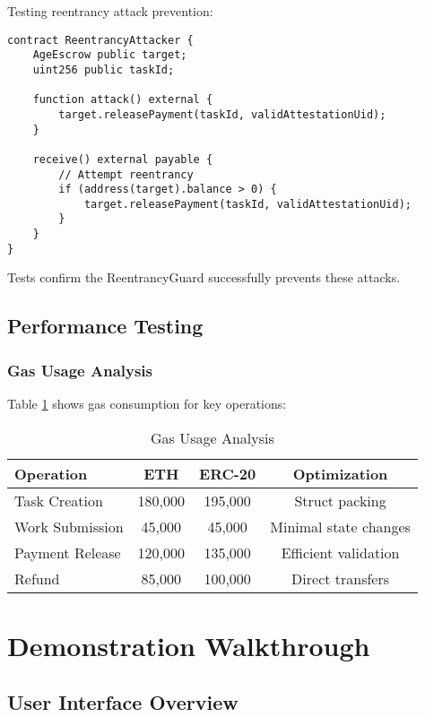 \documentclass[12pt,a4paper]{article}
\begin{document}
Testing reentrancy attack prevention:
\begin{lstlisting}[style=solidity]
contract ReentrancyAttacker {
    AgeEscrow public target;
    uint256 public taskId;
    
    function attack() external {
        target.releasePayment(taskId, validAttestationUid);
    }
    
    receive() external payable {
        // Attempt reentrancy
        if (address(target).balance > 0) {
            target.releasePayment(taskId, validAttestationUid);
        }
    }
}
\end{lstlisting}

Tests confirm the ReentrancyGuard successfully prevents these attacks.

\subsection{Performance Testing}

\subsubsection{Gas Usage Analysis}

Table \ref{tab:gas-usage} shows gas consumption for key operations:

\begin{table}[h]
\centering
\begin{tabular}{|l|c|c|c|}
\hline
\textbf{Operation} & \textbf{ETH} & \textbf{ERC-20} & \textbf{Optimization} \\
\hline
Task Creation & 180,000 & 195,000 & Struct packing \\
\hline
Work Submission & 45,000 & 45,000 & Minimal state changes \\
\hline
Payment Release & 120,000 & 135,000 & Efficient validation \\
\hline
Refund & 85,000 & 100,000 & Direct transfers \\
\hline
\end{tabular}
\caption{Gas Usage Analysis}
\label{tab:gas-usage}
\end{table}

\section{Demonstration Walkthrough}

\subsection{User Interface Overview}
\end{document}
